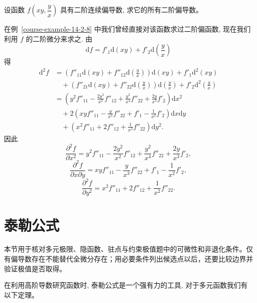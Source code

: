 \documentclass[12pt,fontset=fandol]{ctexart}
\begin{document}
\begin{example}\label{course-example-14-2-10}\quad 设函数 $f\left(xy,\dfrac yx\right)$ 具有二阶连续偏导数, 求它的所有二阶偏导数。

\end{example}
\begin{solve}\quad 在例~\ref{course-example-14-2-8}  中我们曾经直接对该函数求过二阶偏函数, 现在我们利用 $f$ 的二阶微分来求之. 由
\[
  \mathrm df=f'_1\mathrm d(xy)+f'_2\mathrm d\left(\frac yx\right)
\]
得
\[
\begin{aligned}
  \mathrm d^2f
  &=\left(f''_{11}\mathrm d(xy)+f''_{12}\mathrm d\left(\frac yx\right)\right)\mathrm d(xy)
  +f'_1\mathrm d^2(xy)\\
  &\quad+\left(f''_{21}\mathrm d(xy)+f''_{22}\mathrm d\left(\frac yx\right)\right)
  \mathrm d\left(\frac yx\right)+f'_2\mathrm d^2\left(\frac yx\right)\\
  &=\left(y^2f''_{11}-\frac{2y^2}{x^2}f''_{12}
  +\frac{y^2}{x^4}f''_{22}+\frac{2y}{x^3}f'_2\right)\mathrm dx^2\\
  &\quad+2\left(xyf''_{11}-\frac y{x^3}f''_{22}
  +f'_1-\frac1{x^2}f'_2\right)\mathrm dx\mathrm dy\\
  &\quad+\left(x^2f''_{11}+2f''_{12}+\frac1{x^2}f''_{22}\right)\mathrm dy^2.
\end{aligned}
\]
因此
\[
  \frac{\partial^2 f}{\partial x^2}
  =y^2f''_{11}-\frac{2y^2}{x^2}f''_{12}
  +\frac{y^2}{x^4}f''_{22}+\frac{2y}{x^3}f'_2,
\]
\[
  \frac{\partial^2 f}{\partial x\partial y}
  =xyf''_{11}-\frac y{x^3}f''_{22}
  +f'_1-\frac1{x^2}f'_2,
\]
\[
  \frac{\partial^2 f}{\partial y^2}
  =x^2f''_{11}+2f''_{12}+\frac1{x^2}f''_{22}.
\]

\end{solve}


\section{泰勒公式}\label{course-14-3}
本节用于核对多元极限、隐函数、驻点与约束极值题中的可微性和非退化条件。仅有偏导数存在不能替代全微分存在；用必要条件列出候选点以后，还要比较边界并验证极值是否取得。

在利用高阶导数研究函数时, 泰勒公式是一个强有力的工具, 对于多元函数我们有以下定理。
\end{document}
